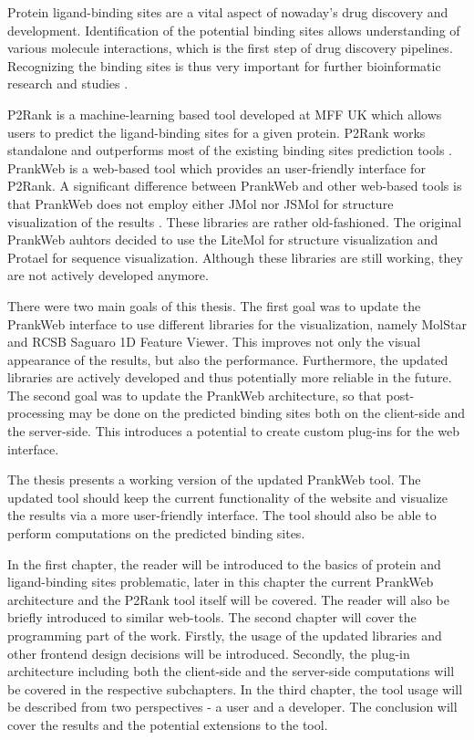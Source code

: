 

Protein ligand-binding sites are a vital aspect of nowaday's drug discovery and development. Identification of the potential binding sites allows understanding of various molecule interactions, which is the first step of drug discovery pipelines. Recognizing the binding sites is thus very important for further bioinformatic research and studies \cite{10.1093/bioinformatics/btt447}.

P2Rank is a machine-learning based tool developed at MFF UK which allows users to predict the ligand-binding sites for a given protein. P2Rank works standalone and outperforms most of the existing binding sites prediction tools \cite{krivak2018p2rank}. PrankWeb is a web-based tool which provides an user-friendly interface for P2Rank. A significant difference between PrankWeb and other web-based tools is that PrankWeb does not employ either JMol nor JSMol for structure visualization of the results \cite{jendele2019prankweb}. These libraries are rather old-fashioned. The original PrankWeb auhtors decided to use the LiteMol for structure visualization and Protael for sequence visualization. Although these libraries are still working, they are not actively developed anymore.

There were two main goals of this thesis. The first goal was to update the PrankWeb interface to use different libraries for the visualization, namely MolStar and RCSB Saguaro 1D Feature Viewer. This improves not only the visual appearance of the results, but also the performance. Furthermore, the updated libraries are actively developed and thus potentially more reliable in the future. The second goal was to update the PrankWeb architecture, so that post-processing may be done on the predicted binding sites both on the client-side and the server-side. This introduces a potential to create custom plug-ins for the web interface.

The thesis presents a working version of the updated PrankWeb tool. The updated tool should keep the current functionality of the website and visualize the results via a more user-friendly interface. The tool should also be able to perform computations on the predicted binding sites.

In the first chapter, the reader will be introduced to the basics of protein and ligand-binding sites problematic, later in this chapter the current PrankWeb architecture and the P2Rank tool itself will be covered. The reader will also be briefly introduced to similar web-tools. The second chapter will cover the programming part of the work. Firstly, the usage of the updated libraries and other frontend design decisions will be introduced. Secondly, the plug-in architecture including both the client-side and the server-side computations will be covered in the respective subchapters. In the third chapter, the tool usage will be described from two perspectives - a user and a developer. The conclusion will cover the results and the potential extensions to the tool.
